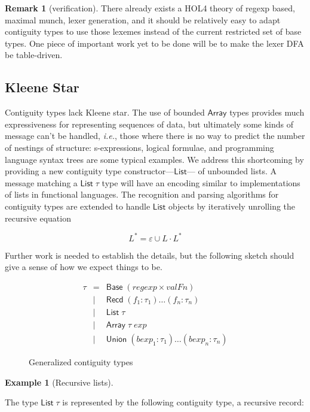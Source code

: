 \documentclass{article}
\newcommand{\ie}{\textit{i.e.}}
\newcommand{\konst}[1]{\ensuremath{\mathsf{#1}}}
\newcommand{\kstar}[1]{\ensuremath{{#1}^{*}}}
\theoremstyle{definition}
\newtheorem*{example}{Example}
\newtheorem{remark}{Remark}
\begin{document}
\begin{remark} [verification] There already exists a
  HOL4 theory of regexp based, maximal munch, lexer generation, and it
  should be relatively easy to adapt contiguity types to use those
  lexemes instead of the current restricted set of base types. One
  piece of important work yet to be done will be to make the lexer DFA
  be table-driven.
\end{remark}

\subsection{Kleene Star}
  Contiguity types lack Kleene star. The use of bounded \konst{Array}
  types provides much expressiveness for representing sequences of
  data, but ultimately some kinds of message can't be handled, \ie,
  those where there is no way to predict the number of nestings of
  structure: s-expressions, logical formulae, and programming language
  syntax trees are some typical examples. We address this shortcoming
  by providing a new contiguity type constructor---\konst{List}---
  of unbounded lists. A message matching a $\konst{List}\;\tau$ type
  will have an encoding similar to implementations of lists in
  functional languages. The recognition and parsing algorithms for
  contiguity types are extended to handle \konst{List} objects by
  iteratively unrolling the recursive equation

\[ \kstar{L} = \varepsilon \cup L \cdot \kstar{L} \]

Further work is needed to establish the details, but the following
sketch should give a sense of how we expect things to be.

\begin{figure}
\[
\begin{array}{rcl}
 \tau & =    & \konst{Base}\; (\mathit{regexp} \times \mathit{valFn}) \\
      & \mid & \konst{Recd}\; (f_1 : \tau_1) \ldots (f_n : \tau_n) \\
      & \mid & \konst{List}\; \tau \\
      & \mid & \konst{Array}\; \tau \; \mathit{exp} \\
      & \mid & \konst{Union}\; (\mathit{bexp}_1 : \tau_1) \ldots (\mathit{bexp}_n : \tau_n)
\end{array}
\]
\caption{Generalized contiguity types}
\label{gen-contig-types}
\end{figure}

\begin{example}[Recursive lists]

\end{example}
The type $\konst{List}\;\tau$ is represented by the following
contiguity type, a recursive record:
\end{document}

